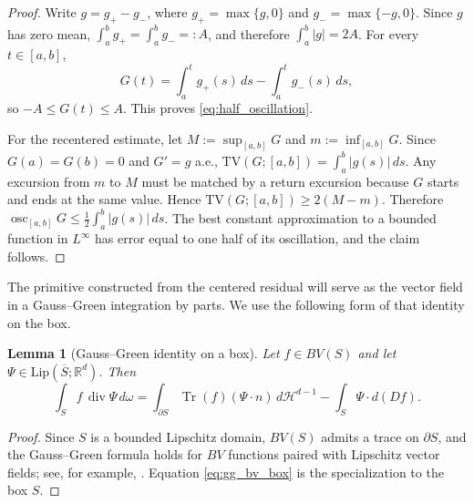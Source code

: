 \documentclass[11pt,letterpaper]{article}
\newtheorem{lemma}[theorem]{Lemma}
\theoremstyle{definition}
\theoremstyle{remark}
\newcommand{\TV}{\mathrm{TV}}
\begin{document}
\begin{proof}
Write $g=g_+-g_-$, where $g_+=\max\{g,0\}$ and
$g_-=\max\{-g,0\}$. Since $g$ has zero mean,
$\int_a^b g_+=\int_a^b g_-=:A$, and therefore
$\int_a^b |g|=2A$. For every $t\in[a,b]$,
$$
G(t)=\int_a^t g_+(s)\,ds-\int_a^t g_-(s)\,ds,
$$
so $-A\le G(t)\le A$. This proves \eqref{eq:half_oscillation}.

For the recentered estimate, let $M:=\sup_{[a,b]}G$ and
$m:=\inf_{[a,b]}G$. Since $G(a)=G(b)=0$ and $G'=g$ a.e.,
$\TV(G;[a,b])=\int_a^b |g(s)|\,ds$. Any excursion from $m$ to $M$ must be
matched by a return excursion because $G$ starts and ends at the same value.
Hence $\TV(G;[a,b])\ge2(M-m)$. Therefore
$\operatorname{osc}_{[a,b]}G\le \frac12\int_a^b |g(s)|\,ds$. The best
constant approximation to a bounded function in $L^\infty$ has error equal to
one half of its oscillation, and the claim follows.
\end{proof}
The primitive constructed from the centered residual will serve as the vector
field in a Gauss--Green integration by parts. We use the following form of that
identity on the box.
\begin{lemma}[Gauss--Green identity on a box]
\label{lem:gg_bv_box}
Let $f\in BV(S)$ and let $\Psi\in\mathrm{Lip}(\overline S;\mathbb R^d)$. Then
\begin{equation}
\label{eq:gg_bv_box}
\int_S f\,\operatorname{div}\Psi\,d\omega
=
\int_{\partial S}\operatorname{Tr}(f)(\Psi\cdot n)\,d\mathcal H^{d-1}
-
\int_S \Psi\cdot d(Df).
\end{equation}
\end{lemma}

\begin{proof}
Since $S$ is a bounded Lipschitz domain, $BV(S)$ admits a trace on
$\partial S$, and the Gauss--Green formula holds for $BV$ functions paired
with Lipschitz vector fields; see, for example,
\cite[Chapter~9]{giovanni_leoni_sobolev}. Equation
\eqref{eq:gg_bv_box} is the specialization to the box $S$.
\end{proof}
\end{document}
